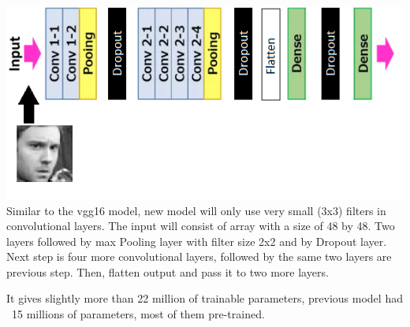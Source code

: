 \includegraphics[scale=1]{images/modelTwo/modelImg.png}
Similar to the vgg16 model, new model will only use very small (3x3) filters in convolutional layers. The input will consist of array with a size of 48 by 48. Two layers followed by max Pooling layer with filter size 2x2 and by Dropout layer. Next step is four more convolutional layers, followed by the same two layers are previous step. Then, flatten output and pass it to two more layers.

It gives slightly more than 22 million of trainable parameters, previous model had ~15 millions of parameters, most of them pre-trained.